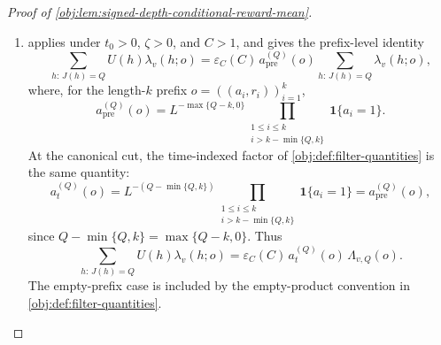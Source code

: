 \begin{proof}[Proof of \cref{obj:lem:signed-depth-conditional-reward-mean}]
\begin{enumerate}
For fixed \(h\) and \(a\), the displayed one-step formula factors \(\mathfrak m_v(r,h'\mid h,a)\) into the reward weight and a hidden-transition probability. Hence
\[
\sum_{h'}\mathfrak m_v(r,h'\mid h,a)
=
\frac{1+\phi(r)\sigma(v)c_0(t_0)U(h)\mathbf 1\{J(h)=Q\}}{2}.
\]
Using \(\sum_a\pi_\zeta(a)=1\), \(\sum_r\phi(r)/2=0\), and \(\sum_r\phi(r)^2/2=1\), the inner one-step payoff is
\[
\begin{aligned}
\sum_{a}\pi_\zeta(a)
\sum_{r}\phi(r)
\sum_{h'}\mathfrak m_v(r,h'\mid h,a)
&=
\sum_a\pi_\zeta(a)
\sum_r \phi(r)
\frac{1+\phi(r)\sigma(v)c_0(t_0)U(h)\mathbf 1\{J(h)=Q\}}{2} \\
&=
\sigma(v)c_0(t_0)U(h)\mathbf 1\{J(h)=Q\}.
\end{aligned}
\]
Therefore
\[
\begin{aligned}
N_v(o)
&=
\sigma(v)c_0(t_0)
\sum_{\eta}\Omega_v(\eta;o)U(h_k)\mathbf 1\{J(h_k)=Q\} \\
&=
\sigma(v)c_0(t_0)
\sum_{h:\,J(h)=Q}U(h)\lambda_v(h;o).
\end{aligned}
\]
This is the numerator identity supplied by \cref{obj:lem:signed-depth-next-reward-numerator}; the displayed derivation records the finite-trajectory regrouping used at the canonical cut. The denominator and the terminal-depth quotient are identified below.

\item
{} applies under \(t_0>0\), \(\zeta>0\), and \(C>1\), and gives the prefix-level identity
\[
\sum_{h:\,J(h)=Q}U(h)\lambda_v(h;o)
=
\varepsilon_C(C)\,a_{\mathrm{pre}}^{(Q)}(o)
\sum_{h:\,J(h)=Q}\lambda_v(h;o),
\]
where, for the length-\(k\) prefix \(o=((a_i,r_i))_{i=1}^k\),
\[
a_{\mathrm{pre}}^{(Q)}(o)
=
L^{-\max\{Q-k,0\}}
\prod_{\substack{1\le i\le k\\ i>k-\min\{Q,k\}}}
\mathbf 1\{a_i=1\}.
\]
At the canonical cut, the time-indexed factor of \cref{obj:def:filter-quantities} is the same quantity:
\[
a_t^{(Q)}(o)
=
L^{-(Q-\min\{Q,k\})}
\prod_{\substack{1\le i\le k\\ i>k-\min\{Q,k\}}}
\mathbf 1\{a_i=1\}
=
a_{\mathrm{pre}}^{(Q)}(o),
\]
since \(Q-\min\{Q,k\}=\max\{Q-k,0\}\). Thus
\[
\sum_{h:\,J(h)=Q}U(h)\lambda_v(h;o)
=
\varepsilon_C(C)\,a_t^{(Q)}(o)\,\Lambda_{v,Q}(o).
\]
The empty-prefix case is included by the empty-product convention in \cref{obj:def:filter-quantities}. %


\end{enumerate}
\end{proof}
